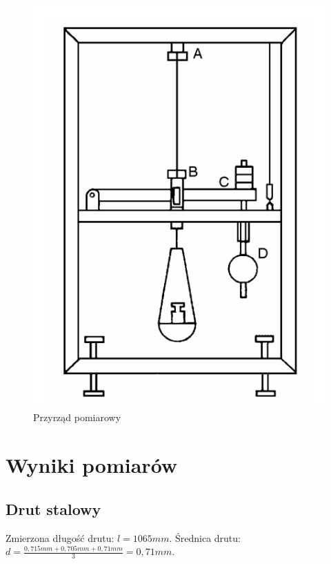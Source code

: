 \documentclass[a4paper,10pt,twoside]{article}
\begin{document}
\begin{figure}[!htp]
\centerline{\includegraphics[scale=0.35]{przyrzad.png}}
\caption{Przyrząd pomiarowy}
\label{fig:tl}
\end{figure}

\newpage

\section{Wyniki pomiarów}

\subsection{Drut stalowy}

Zmierzona długość drutu: $ l = 1065 \unit{mm} $.
Średnica drutu: $ d = \frac{0,715 \unit{mm} + 0,705 \unit{mm} + 0,71 \unit{mm}}{3} = 0,71 \unit{mm}$.
\end{document}
